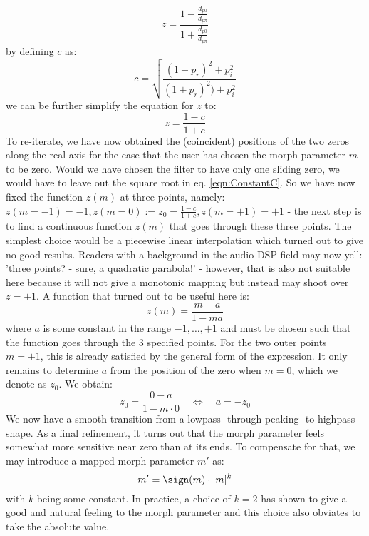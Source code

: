 \begin{equation}
 z = \frac{ 1-\frac{d_{p0}}{d_{p \pi}} } { 1+\frac{d_{p0}}{d_{p \pi}} }
\end{equation}
by defining $c$ as:
\begin{equation}
\label{eqn:ConstantC}
 c = \sqrt{ \frac{ (1-p_r)^2+p_i^2 } { (1+p_r)^2)+p_i^2 } }
\end{equation}
we can be further simplify the equation for $z$ to:
\begin{equation}
 z = \frac{ 1-c } { 1+c }
\end{equation}
To re-iterate, we have now obtained the (coincident) positions of the two zeros along the real axis for the case that the user has chosen the morph parameter $m$ to be zero. Would we have chosen the filter to have only one sliding zero, we would have to leave out the square root in eq. \ref{eqn:ConstantC}. So we have now fixed the function $z(m)$ at three points, namely: $z(m=-1)=-1, z(m=0):=z_0=\frac{1-c}{1+c}, z(m=+1)=+1$ - the next step is to find a continuous function $z(m)$ that goes through these three points. The simplest choice would be a piecewise linear interpolation which turned out to give no good results. Readers with a background in the audio-DSP field may now yell: 'three points? - sure, a quadratic parabola!' - however, that is also not suitable here because it will not give a monotonic mapping but instead may shoot over $z = \pm 1$. A function that turned out to be useful here is:
\begin{equation}
 z(m) = \frac{m-a}{1-ma}
\end{equation}
where $a$ is some constant in the range $-1, \ldots, +1$ and must be chosen such that the function goes through the 3 specified points. For the two outer points $m = \pm 1$, this is already satisfied by the general form of the expression. It only remains to determine $a$ from the position of the zero when $m=0$, which we denote as $z_0$. We obtain:
\begin{equation}
 z_0 = \frac{0-a}{1-m \cdot 0} \quad \Leftrightarrow \quad a = -z_0
\end{equation}
We now have a smooth transition from a lowpass- through peaking- to highpass-shape. As a final refinement, it turns out that the morph parameter feels somewhat more sensitive near zero than at its ends. To compensate for that, we may introduce a mapped morph parameter $m'$ as:
\begin{equation}
 m' = \sign(m) \cdot |m|^k
\end{equation}
with $k$ being some constant. In practice, a choice of $k=2$ has shown to give a good and natural feeling to the morph parameter and this choice also obviates to take the absolute value.
















